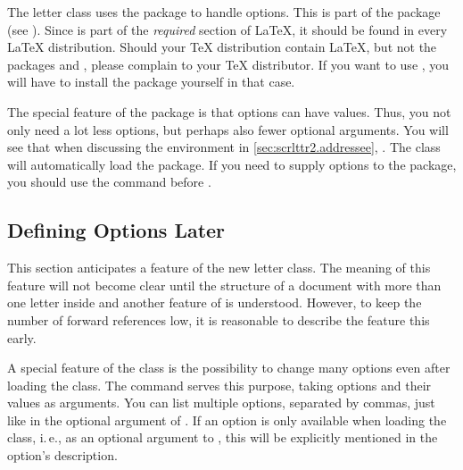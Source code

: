 The letter class  uses the package
 to handle options. This is part
of the  package (see \cite{package:graphics}). Since
 is part of the \emph{required} section of {\LaTeX},
it should be found in every {\LaTeX} distribution. Should your {\TeX}
distribution contain {\LaTeX}, but not the packages 
and , please complain to your {\TeX} distributor. If
you want to use , you will have to install the
 package yourself in that case.

\begin{Explain}
  The special feature of the  package is that options
  can have values. Thus, you not only need a lot less options, but
  perhaps also fewer optional arguments. You will see that when
  discussing the  environment in
  \autoref{sec:scrlttr2.addressee},
  . The class will
  automatically load the  package. If you need to
  supply options to the  package, you should use the
   command before .
\end{Explain}

\subsection{Defining Options Later}
\label{sec:scrlttr2.options.late}

This section anticipates a feature of the new letter class. The
meaning of this feature will not become clear until the structure of a
document with more than one letter inside and another feature of
 is understood. However, to keep the number of forward
references low, it is reasonable to describe the feature this early.

\begin{Declaration}
\end{Declaration}
%
A special feature of the  class is the possibility to
change many options even after loading the class. The
 command serves this purpose, taking options and
their values as arguments. You can list multiple options, separated by
commas, just like in the optional argument of
. If an option is only available when loading the
class, i.\,e., as an optional argument to , this
will be explicitly mentioned in the option's description.

